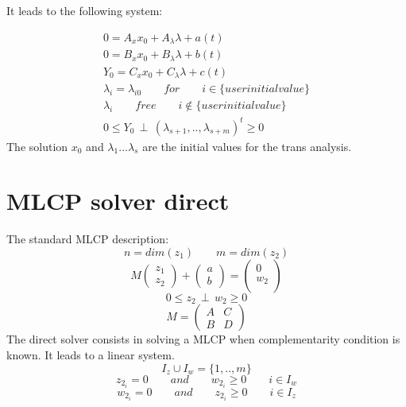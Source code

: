 It leads to the following system:

 \begin{eqnarray}
0=A_{x}x_{0} +A_{\lambda} \lambda +a(t)\\
0=B_{x}x_{0}+ B_{\lambda}\lambda + b(t)\\
Y_{0}=C_{x}x_{0}+C_{\lambda}\lambda + c(t) \\
\lambda_{i} = \lambda_{i0} \qquad for \qquad i \in \{ user initial value \}\\
\lambda_{i} \qquad free \qquad i \notin \{ user initial value \}\\
0 \leq Y_0 \, \perp \, (\lambda_{s+1},..,\lambda_{s+m})^{t} \geq 0
\end{eqnarray}
The solution $x_{0}$ and $\lambda_{1}...\lambda_{s}$ are the initial values for the trans analysis.
\newpage

\section{MLCP solver direct}
The standard MLCP description:
\[n=dim(z_{1}) \qquad m=dim(z_{2})\]
\[M \left(\begin{array}{c} z_{1}\\z_{2} \end{array}\right)+\left(\begin{array}{c} a\\b \end{array}\right)=\left(\begin{array}{c} 0\\w_{2}\\ \end{array}\right)\]
\[0 \leq z_{2} \, \perp \, w_{2} \geq 0\]
\[M=\left(\begin{array}{cc} A&C\\B&D \end{array}\right)\]
The direct solver consists in solving a MLCP when complementarity condition is known. It leads to a
linear system.
\[I_{z} \cup I_{w} = \{ 1,..,m\}\]
\[z_{2_{i}}=0 \qquad and \qquad w_{2_{i}} \geq 0 \qquad i \in I_{w} \]
\[w_{2_{i}}=0 \qquad and \qquad z_{2_{i}} \geq 0 \qquad i \in I_{z} \]

